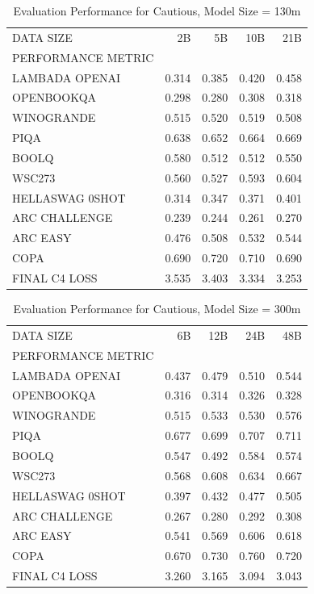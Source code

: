 \begin{table}
[H] \centering \caption{Evaluation Performance for Cautious, Model Size = 130m}
\label{tab:eval-performance-cautious-130M}
\begin{tabular}{lrrrr}
\toprule
DATA SIZE & 2B & 5B & 10B & 21B \\
PERFORMANCE METRIC &  &  &  &  \\
\midrule
LAMBADA OPENAI & 0.314 & 0.385 & 0.420 & 0.458 \\
OPENBOOKQA & 0.298 & 0.280 & 0.308 & 0.318 \\
WINOGRANDE & 0.515 & 0.520 & 0.519 & 0.508 \\
PIQA & 0.638 & 0.652 & 0.664 & 0.669 \\
BOOLQ & 0.580 & 0.512 & 0.512 & 0.550 \\
WSC273 & 0.560 & 0.527 & 0.593 & 0.604 \\
HELLASWAG 0SHOT & 0.314 & 0.347 & 0.371 & 0.401 \\
ARC CHALLENGE & 0.239 & 0.244 & 0.261 & 0.270 \\
ARC EASY & 0.476 & 0.508 & 0.532 & 0.544 \\
COPA & 0.690 & 0.720 & 0.710 & 0.690 \\
FINAL C4 LOSS & 3.535 & 3.403 & 3.334 & 3.253 \\
\bottomrule
\end{tabular}
\end{table}


\begin{table}
[H] \centering \caption{Evaluation Performance for Cautious, Model Size = 300m}
\label{tab:eval-performance-cautious-300M}
\begin{tabular}{lrrrr}
\toprule
DATA SIZE & 6B & 12B & 24B & 48B \\
PERFORMANCE METRIC &  &  &  &  \\
\midrule
LAMBADA OPENAI & 0.437 & 0.479 & 0.510 & 0.544 \\
OPENBOOKQA & 0.316 & 0.314 & 0.326 & 0.328 \\
WINOGRANDE & 0.515 & 0.533 & 0.530 & 0.576 \\
PIQA & 0.677 & 0.699 & 0.707 & 0.711 \\
BOOLQ & 0.547 & 0.492 & 0.584 & 0.574 \\
WSC273 & 0.568 & 0.608 & 0.634 & 0.667 \\
HELLASWAG 0SHOT & 0.397 & 0.432 & 0.477 & 0.505 \\
ARC CHALLENGE & 0.267 & 0.280 & 0.292 & 0.308 \\
ARC EASY & 0.541 & 0.569 & 0.606 & 0.618 \\
COPA & 0.670 & 0.730 & 0.760 & 0.720 \\
FINAL C4 LOSS & 3.260 & 3.165 & 3.094 & 3.043 \\
\bottomrule
\end{tabular}
\end{table}


